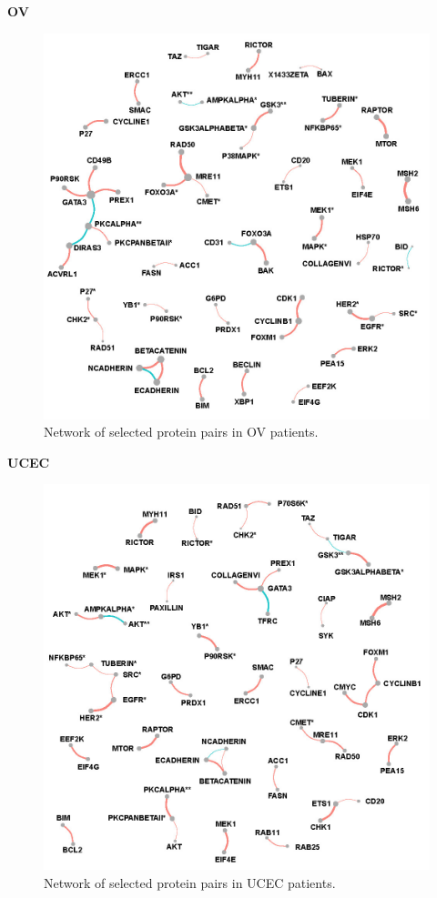 \documentclass[
]{book}
\begin{document}
\textbf{OV}

\begin{figure}

{\centering \includegraphics[width=0.7\linewidth]{images/pan_fullnet_ov} 

}

\caption{Network of selected protein pairs in OV patients.}\label{fig:ovfullnet}
\end{figure}

\textbf{UCEC}

\begin{figure}

{\centering \includegraphics[width=0.7\linewidth]{images/pan_fullnet_ucec} 

}

\caption{Network of selected protein pairs in UCEC patients.}\label{fig:ucecfullnet}
\end{figure}
\end{document}
